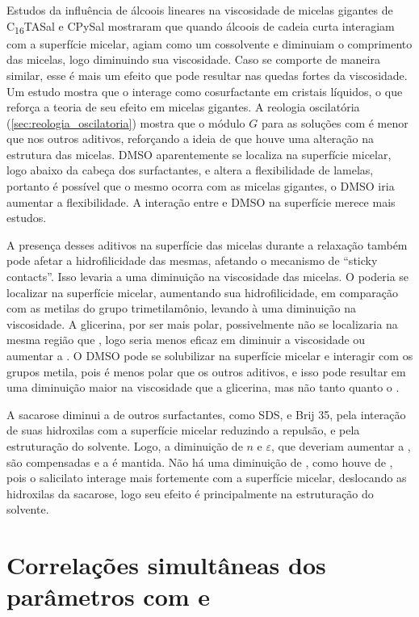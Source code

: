 		Estudos da influência de álcoois lineares na viscosidade de micelas gigantes de C\textsubscript{16}TASal e CPySal\cite{Bayer1986} mostraram que quando álcoois de cadeia curta interagiam com a superfície micelar, agiam como um cossolvente e diminuiam o comprimento das micelas, logo diminuindo sua viscosidade. Caso \BD{} se comporte de maneira similar, esse é mais um efeito que pode resultar nas quedas fortes da viscosidade. Um estudo mostra que o \BD{} interage como cosurfactante em cristais líquidos, o que reforça a teoria de seu efeito em micelas gigantes.\cite{Iwanaga1998a} A reologia oscilatória (\autoref{sec:reologia_oscilatoria}) mostra que o módulo \(G\) para as soluções com \BD{} é menor que nos outros aditivos, reforçando a ideia de que houve uma alteração na estrutura das micelas. DMSO aparentemente se localiza na superfície micelar, logo abaixo da cabeça dos surfactantes, e altera a flexibilidade de lamelas,\cite{Notman2006} portanto é possível que o mesmo ocorra com as micelas gigantes, o DMSO iria aumentar a flexibilidade. A interação entre \Sal{} e DMSO na superfície merece mais estudos.
		
		A presença desses aditivos na superfície das micelas durante a relaxação também pode afetar a hidrofilicidade das mesmas, afetando o mecanismo de ``sticky contacts''. Isso levaria a uma diminuição na viscosidade das micelas. O \BD{} poderia se localizar na superfície micelar, aumentando sua hidrofilicidade, em comparação com as metilas do grupo trimetilamônio, levando à uma diminuição na viscosidade. A glicerina, por ser mais polar, possivelmente não se localizaria na mesma região que \BD, logo seria menos eficaz em diminuir a viscosidade ou aumentar a \cmc. O DMSO pode se solubilizar na superfície micelar e interagir com os grupos metila, pois é menos polar que os outros aditivos, e isso pode resultar em uma diminuição maior na viscosidade que a glicerina, mas não tanto quanto o \BD{}. 
		
		A sacarose diminui a \cmc{} de outros surfactantes, como SDS, \CTAB{} e Brij 35, pela interação de suas hidroxilas com a superfície micelar reduzindo a repulsão, e pela estruturação do solvente. Logo, a diminuição de \(n\) e \(\varepsilon\), que deveriam aumentar a \cwlm{}, são compensadas e a \cwlm{} é mantida. Não há uma diminuição de \cwlm, como houve de \cmc, pois o salicilato interage mais fortemente com a superfície micelar, deslocando as hidroxilas da sacarose, logo seu efeito é principalmente na estruturação do solvente.
		
		\section{Correlações simultâneas dos parâmetros com \cmc{} e \DHmic}
		\label{sec:correlacao_params_cmc_dh}
		
